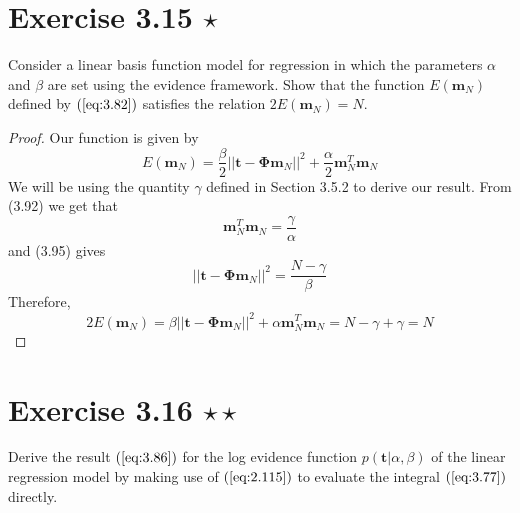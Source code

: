 \section*{Exercise 3.15 $\star$}
Consider a linear basis function model for regression in which the parameters
$\alpha$ and $\beta$ are set using the evidence framework. Show that the
function $E(\mathbf{m}_N)$ defined by $(\ref{eq:3.82})$ satisfies the relation
$2E(\mathbf{m}_N) = N$.

\vspace{1em}

\begin{proof}
    Our function is given by
    \begin{equation}\label{eq:3.82}\tag{3.82}
        E(\mathbf{m}_N) = \frac{\beta}{2} ||\mathbf{t} - \mathbf{\Phi}\mathbf{m}_N||^2
        + \frac{\alpha}{2} \mathbf{m}_N^T\mathbf{m}_N
    \end{equation}
    We will be using the quantity $\gamma$ defined in Section 3.5.2 to 
    derive our result. From (3.92) we get that
     \[
         \mathbf{m}_N^T\mathbf{m}_N = \frac{\gamma}{\alpha}
    \] 
    and (3.95) gives
    \[
        ||\mathbf{t} - \mathbf{\Phi}\mathbf{m}_N||^2 = \frac{N - \gamma}{\beta}
    \] 
    Therefore,
    \[
        2E(\mathbf{m}_N) 
        = \beta||\mathbf{t} - \mathbf{\Phi}\mathbf{m}_N||^2 + \alpha\mathbf{m}_N^T\mathbf{m}_N
        = N - \gamma + \gamma = N
    \] 
\end{proof}

\section*{Exercise 3.16 $\star \star$}
Derive the result $(\ref{eq:3.86})$ for the log evidence
function $p(\mathbf{t} | \alpha, \beta)$ of the linear
regression model by making use of $(\ref{eq:2.115})$ to
evaluate the integral $(\ref{eq:3.77})$ directly.

\vspace{1em}

